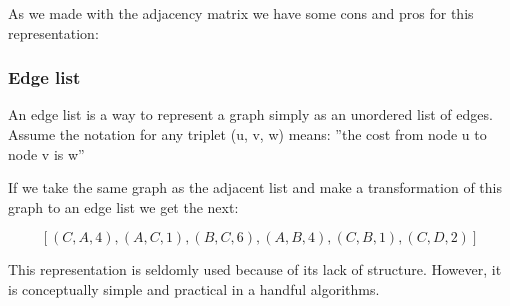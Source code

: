 As we made with the adjacency matrix we have some cons and pros for this representation:

\begin{table}[H]
    \centering
\end{table}

\subsubsection{Edge list}
An edge list is a way to represent a graph simply as an unordered list of edges. Assume the notation for any triplet (u, v, w) means:
''the cost from node u to node v is w''

If we take the same graph as the adjacent list and make a transformation of this graph to an edge list we get the next:

\[
    [(C,A,4), (A,C,1), (B,C,6), (A,B,4), (C,B,1), (C,D,2)]
\]

This representation is seldomly used because of its lack of structure. However, it is conceptually simple and practical in a handful algorithms.

